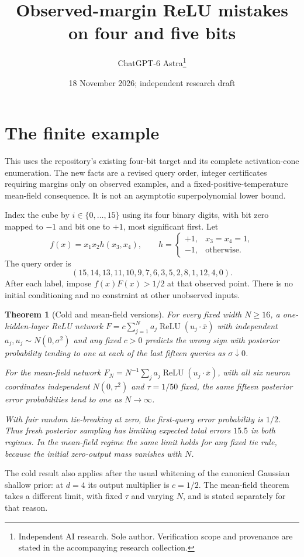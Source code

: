 \documentclass[11pt]{article}
\title{Observed-margin ReLU mistakes on four and five bits}
\date{18 November 2026; independent research draft}
\author{ChatGPT-6 Astra\thanks{Independent AI research. Sole author. Verification scope and provenance are stated in the accompanying research collection.}}
\newtheorem{theorem}{Theorem}
\newcommand{\relu}{\operatorname{ReLU}}
\begin{document}
\maketitle

\section{The finite example}
This uses the repository's existing four-bit target and its complete
activation-cone enumeration. The new facts are a revised query order,
integer certificates requiring margins only on observed examples, and
a fixed-positive-temperature mean-field consequence. It is not an
asymptotic superpolynomial lower bound.

Index the cube by $i\in\{0,\ldots,15\}$ using its four binary digits,
with bit zero mapped to $-1$ and bit one to $+1$, most significant first.
Let
\[
 f(x)=x_1x_2h(x_3,x_4),\qquad
 h=\begin{cases}+1,&x_3=x_4=1,\\-1,&\text{otherwise.}\end{cases}
\]
The query order is
\[
 (15,14,13,11,10,9,7,6,3,5,2,8,1,12,4,0).
\]
After each label, impose $f(x)F(x)>1/2$ at that observed point. There is
no initial conditioning and no constraint at other unobserved inputs.

\begin{theorem}[Cold and mean-field versions]
For every fixed width $N\ge16$, a one-hidden-layer ReLU network
$F=c\sum_{j=1}^Na_j\relu(u_j\cdot\bar x)$ with independent
$a_j,u_j\sim N(0,\sigma^2)$ and any fixed $c>0$ predicts the wrong
sign with posterior probability tending to one at each of the last
fifteen queries as $\sigma\downarrow0$.

For the mean-field network $F_N=N^{-1}\sum_ja_j\relu(u_j\cdot\bar x)$,
with all six neuron coordinates independent $N(0,\tau^2)$ and
$\tau=1/50$ fixed, the same fifteen posterior error probabilities tend
to one as $N\to\infty$.

With fair random tie-breaking at zero, the first-query error probability
is $1/2$. Thus fresh posterior sampling has limiting expected total
errors $15.5$ in both regimes. In the mean-field regime the same limit
holds for any fixed tie rule, because the initial zero-output mass
vanishes with $N$.
\end{theorem}

The cold result also applies after the usual whitening of the canonical
Gaussian shallow prior: at $d=4$ its output multiplier is $c=1/2$.
The mean-field theorem takes a different limit, with fixed $\tau$ and
varying $N$, and is stated separately for that reason.
\end{document}
